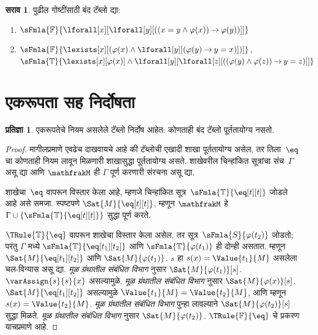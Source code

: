 \documentclass[11pt,a4paper,openany]{book}
\theoremstyle{definition}
\newtheorem{prop}[defn]{प्रतिज्ञा}
\newtheorem{prob}{सराव}[chapter]
\newcommand{\lif}{\mathbin{\to}}
\newcommand{\applytofirst}[2]{{\expandafter#1#2}}
\newcommand{\Struct}[1]{\applytofirst{\mathfrak}{#1}}
\newcommand{\True}{\ensuremath{\mathbb{T}}}
\newcommand{\False}{\ensuremath{\mathbb{F}}}
\newcommand{\readerexternalref}[1]{\textit{मूळ ग्रंथातील संबंधित विभाग}}
\begin{document}
\begin{prob}
पुढील गोष्टींसाठी बंद टॅब्लो द्या:
\begin{enumerate}
\item $\sFmla{\False}{\lforall[x][\lforall[y][((x = y \land \varphi(x))
      \lif \varphi(y))]]}$
\item $\sFmla{\False}{\lexists[x][(\varphi(x) \land
    \lforall[y][(\varphi(y) \lif y = x)])]}$,\\
  $\sFmla{\True}{\lexists[x][\varphi(x)] \land
    \lforall[y][\lforall[z][((\varphi(y) \land \varphi(z)) \lif y = z)]]}$
\end{enumerate}
\end{prob}












\section{एकरूपता सह निर्दोषता}\label{fol:tab:sid:sec}

\begin{prop}
एकरूपतेचे नियम असलेले टॅब्लो निर्दोष आहेत: कोणताही बंद टॅब्लो
  पूर्ततायोग्य नसतो.
\end{prop}

\begin{proof}
मागीलप्रमाणे एवढेच दाखवायचे आहे की टॅब्लोची एखादी शाखा पूर्ततायोग्य
असेल, तर तिला~$\eq$ चा कोणताही नियम लावून मिळणारी शाखासुद्धा पूर्ततायोग्य
असते. शाखेवरील चिन्हांकित सूत्रांचा संच~$\Gamma$ असू द्या आणि
$\Struct{M}$ ही $\Gamma$ पूर्ण करणारी संरचना असू द्या.

शाखेचा~$\eq$ वापरून विस्तार केला आहे, म्हणजे चिन्हांकित
सूत्र~$\sFmla{\True}{\eq[t][t]}$ जोडले आहे असे समजा. स्पष्टपणे
$\Sat{M}{\eq[t][t]}$, म्हणून $\Struct{M}$ हे
$\Gamma \cup \{\sFmla{\True}{\eq[t][t]}\}$ सुद्धा पूर्ण करते.

$\TRule{\True}{\eq}$ वापरून शाखेचा विस्तार केला असेल, तर
सूत्र~$\sFmla{S}{\varphi(t_2)}$ जोडतो; परंतु $\Gamma$ मध्ये
$\sFmla{\True}{\eq[t_1][t_2]}$ आणि $\sFmla{\True}{\varphi(t_1)}$ ही दोन्ही
असतात. म्हणून $\Sat{M}{\eq[t_1][t_2]}$ आणि $\Sat{M}{\varphi(t_1)}$.
$s$ हा $s(x) = \Value{t_1}{M}$ असलेला चल-विन्यास असू द्या.
\readerexternalref{fol:syn:ass:prop:sentence-sat-true} नुसार
$\Sat{M}{\varphi(t_1)}[s]$. $\varAssign{s}{s}{x}$ असल्यामुळे,
\readerexternalref{fol:syn:ext:prop:ext-formulas} नुसार $\Sat{M}{\varphi(x)}[s]$.
$\Sat{M}{\eq[t_1][t_2]}$ असल्यामुळे
$\Value{t_1}{M} = \Value{t_2}{M}$, आणि म्हणून
$s(x) = \Value{t_2}{M}$. \readerexternalref{fol:syn:ext:prop:ext-formulas} पुन्हा
लावल्याने $\Sat{M}{\varphi(t_2)}[s]$ सुद्धा मिळते.
\readerexternalref{fol:syn:ass:prop:sentence-sat-true} नुसार
$\Sat{M}{\varphi(t_2)}$. $\TRule{\False}{\eq}$ चे प्रकरण याचप्रमाणे आहे.
\end{proof}
\end{document}
